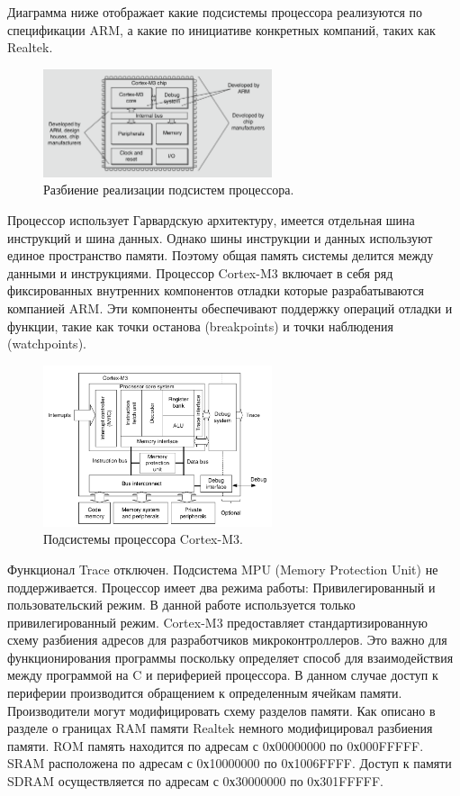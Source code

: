 Диаграмма ниже отображает какие подсистемы процессора реализуются по спецификации ARM, а какие по инициативе конкретных компаний, таких как Realtek.

\begin{figure}[h!]
    \centering
    \includegraphics[width=0.6\textwidth]{arm_vs_custom_modules.png}
    \caption{Разбиение реализации подсистем процессора.}
\end{figure}


Процессор использует Гарвардскую архитектуру, имеется отдельная шина инструкций и шина данных. Однако шины инструкции и данных используют единое пространство памяти. Поэтому общая память системы делится между данными и инструкциями. Процессор Cortex-M3 включает в себя ряд фиксированных внутренних компонентов отладки которые разрабатываются компанией ARM. Эти компоненты обеспечивают поддержку операций отладки и функции, такие как точки останова (breakpoints) и точки наблюдения (watchpoints).

\begin{figure}[h!]
    \centering
    \includegraphics[width=0.6\textwidth]{cortex_m3_subsystems_overview.png}
    \caption{Подсистемы процессора Cortex-M3.}
\end{figure}


Функционал Trace отключен. Подсистема MPU (Memory Protection Unit) не поддерживается.
Процессор имеет два режима работы: Привилегированный и пользовательский режим. В данной работе используется только привилегированный режим. Cortex-M3 предоставляет стандартизированную схему разбиения адресов для разработчиков микроконтроллеров. Это важно для функционирования программы поскольку определяет способ для взаимодействия между программой на C и периферией процессора. В данном случае доступ к периферии производится обращением к определенным ячейкам памяти. Производители могут модифицировать схему разделов памяти. Как описано в разделе о границах RAM памяти Realtek немного модифицировал разбиения памяти. ROM память находится по адресам с 0х00000000 по 0х000FFFFF. SRAM расположена по адресам с 0х10000000 по 0х1006FFFF. Доступ к памяти SDRAM осуществляется по адресам с 0х30000000 по 0х301FFFFF.
 
